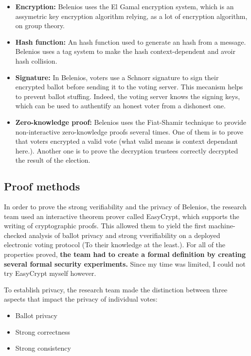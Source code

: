 \documentclass[12pt, a4paper]{report}
\begin{document}
\begin{itemize}
\item \textbf{Encryption:} Belenios uses the El Gamal encryption system, which is an assymetric key encryption algorithm relying, as a lot of encryption algorithm, on group theory.

\item \textbf{Hash function:} An hash function used to generate an hash from a message. Belenios uses a tag system to make the hash context-dependent and avoir hash collision.

\item \textbf{Signature:} In Belenios, voters use a Schnorr signature to sign their encrypted ballot before sending it to the voting server. This mecanism helps to prevent ballot stuffing. Indeed, the voting server knows the signing keys, which can be used to authentify an honest voter from a dishonest one.

\item \textbf{Zero-knowledge proof:} Belenios uses the Fiat-Shamir technique to provide non-interactive zero-knowledge proofs several times. One of them is to prove that voters encrypted a valid vote (what valid  means is context dependant here.). Another one is to prove the decryption trustees correctly decrypted the result of the election. 
\end{itemize}

\subsection{Proof methods}

In order to prove the strong verifiability and the privacy of Belenios, the research team used an interactive theorem prover called EasyCrypt, which supports the writing of cryptographic proofs.
This allowed them to yield the first machine-checked analysis of ballot privacy and strong vverifiability on a deployed electronic voting protocol (To their knowledge at the least.). For all of the properties proved, \textbf{the team had to create a formal definition by creating several formal security experiments.} Since my time was limited, I could not try EasyCrypt myself however.

To establish privacy, the research team made the distinction between three aspects that impact the privacy of individual votes:

\begin{itemize}
\item Ballot privacy
\item Strong correctness
\item Strong consistency
\end{itemize}
\end{document}
